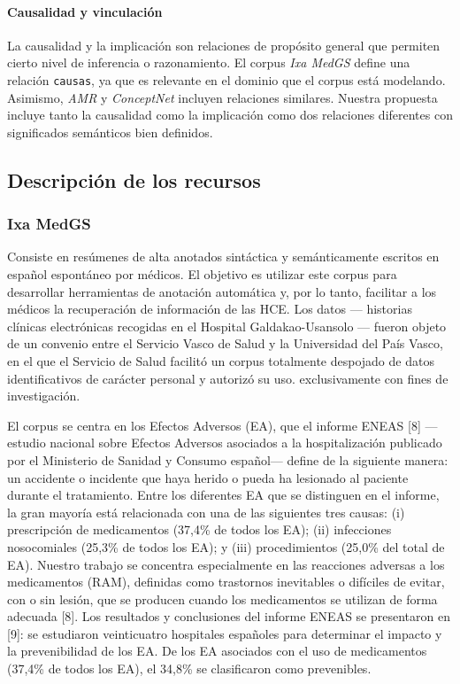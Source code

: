 \paragraph{Causalidad y vinculación}

La causalidad y la implicación son relaciones de propósito general que permiten cierto nivel de inferencia o razonamiento. El corpus \textit{Ixa MedGS} define una relación \texttt{causas}, ya que es relevante en el dominio que el corpus está modelando. Asimismo, \textit{AMR} y \textit{ConceptNet} incluyen relaciones similares. Nuestra propuesta incluye tanto la causalidad como la implicación como dos relaciones diferentes con significados semánticos bien definidos.

\subsection{Descripción de los recursos}

\subsubsection*{Ixa MedGS}

Consiste en resúmenes de alta anotados sintáctica y semánticamente escritos en español espontáneo por médicos. El objetivo es utilizar este corpus para desarrollar herramientas de anotación automática y, por lo tanto, facilitar a los médicos la recuperación de información de las HCE. Los datos — historias clínicas electrónicas recogidas en el Hospital Galdakao-Usansolo — fueron objeto de un convenio entre el Servicio Vasco de Salud y la Universidad del País Vasco, en el que el Servicio de Salud facilitó un corpus totalmente despojado de datos identificativos de carácter personal y autorizó su uso. exclusivamente con fines de investigación.

El corpus se centra en los Efectos Adversos (EA), que el informe ENEAS [8] —estudio nacional sobre Efectos Adversos asociados a la hospitalización publicado por el Ministerio de Sanidad y Consumo español— define de la siguiente manera: un accidente o incidente que haya herido o pueda ha lesionado al paciente durante el tratamiento. Entre los diferentes EA que se distinguen en el informe, la gran mayoría está relacionada con una de las siguientes tres causas: (i) prescripción de medicamentos (37,4\% de todos los EA); (ii) infecciones nosocomiales (25,3\% de todos los EA); y (iii) procedimientos (25,0\% del total de EA). Nuestro trabajo se concentra especialmente en las reacciones adversas a los medicamentos (RAM), definidas como trastornos inevitables o difíciles de evitar, con o sin lesión, que se producen cuando los medicamentos se utilizan de forma adecuada [8]. Los resultados y conclusiones del informe ENEAS se presentaron en [9]: se estudiaron veinticuatro hospitales españoles para determinar el impacto y la prevenibilidad de los EA. De los EA asociados con el uso de medicamentos (37,4\% de todos los EA), el 34,8\% se clasificaron como prevenibles.

